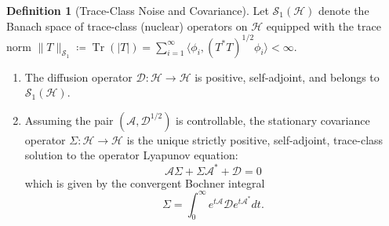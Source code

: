 \documentclass[11pt]{amsart}
\theoremstyle{plain}
\theoremstyle{definition}
\newtheorem{definition}[theorem]{Definition}
\theoremstyle{remark}
\newcommand{\tr}{\operatorname{Tr}}
\begin{document}
    \begin{definition}[Trace-Class Noise and Covariance]
        \label{def:trace_class}
        Let $\mathcal{S}_1(\mathcal{H})$ denote the Banach space of trace-class (nuclear) operators on $\mathcal{H}$ equipped with the trace norm $\|T\|_{\mathcal{S}_1} \coloneqq \tr(|T|) = \sum_{i=1}^\infty \langle \phi_i, (T^*T)^{1/2} \phi_i \rangle < \infty$.
        \begin{enumerate}
            \item[(i)] The diffusion operator $\mathcal{D}: \mathcal{H} \to \mathcal{H}$ is positive, self-adjoint, and belongs to $\mathcal{S}_1(\mathcal{H})$.
            \item[(ii)] Assuming the pair $(\mathcal{A}, \mathcal{D}^{1/2})$ is controllable, the stationary covariance operator $\Sigma: \mathcal{H} \to \mathcal{H}$ is the unique strictly positive, self-adjoint, trace-class solution to the operator Lyapunov equation:
            \begin{equation}
                \label{eq:op_lyapunov}
                \mathcal{A}\Sigma + \Sigma\mathcal{A}^* + \mathcal{D} = 0
            \end{equation}
            which is given by the convergent Bochner integral
            \[
            \Sigma = \int_0^\infty e^{t\mathcal{A}} \mathcal{D} e^{t\mathcal{A}^*} dt.
            \]
        \end{enumerate}
    \end{definition}
\end{document}
